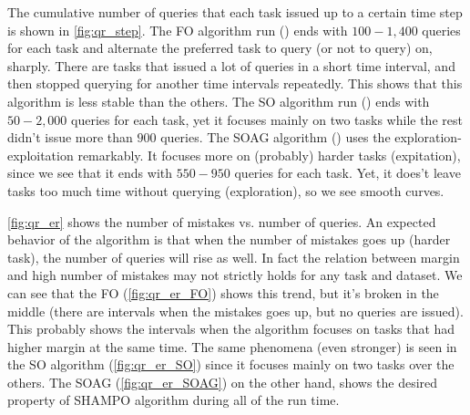 The cumulative number of queries that each task issued up to a certain time step is shown in 
\eqref{fig:qr_step}. The FO algorithm run () ends with $100-1,400$ queries for each task and alternate 
the preferred task to query (or not to query) on, sharply. There are tasks that 
issued a lot of queries in a short time interval, and then stopped querying for 
another time intervals repeatedly. This shows that this algorithm is 
less stable than the others. The SO algorithm run ()  ends with $50-2,000$ queries for each 
task, yet it focuses mainly on two tasks while the rest didn't issue more than $900$ 
queries. The SOAG algorithm () uses the exploration-exploitation remarkably. It 
focuses more on (probably) harder tasks (expitation), since we see that it ends with $550-950$ queries for each 
task. Yet, it does't leave tasks too much time without querying (exploration), so we see smooth curves.

\eqref{fig:qr_er} shows the number of mistakes vs. number of queries. An expected 
behavior of the algorithm is that when the number of mistakes goes up (harder 
task), the number of queries will rise as well. In fact the relation between 
margin and high number of mistakes may not strictly holds for any task and 
dataset. We can see that the FO (\eqref{fig:qr_er_FO}) shows this trend, but it's 
broken in the middle (there are intervals when the mistakes goes up, but no queries are 
issued). This probably shows the intervals when the algorithm focuses on tasks 
that had higher margin at the same time. The same phenomena (even stronger) is seen in the SO algorithm 
(\eqref{fig:qr_er_SO}) since it focuses mainly on two tasks over the others. The SOAG (\eqref{fig:qr_er_SOAG}) 
on the other hand, shows the desired property of SHAMPO algorithm during all of the run time. 

